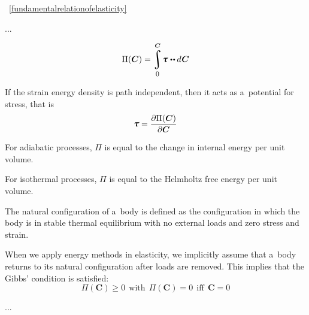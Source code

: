 

~\eqref{fundamentalrelationofelasticity}

...

{\small

\[ \Pi({\boldsymbol{\bm{C}}}) = \displaystyle \integral_{\raisemath{-0.25em}{\hspace{-0.1ex}\scalebox{0.85}{$0$}}}^{\raisemath{.15em}{\bm{C}}} \hspace{-0.25ex} \cauchystress \hspace{.1ex} \dotdotp d \hspace{.1ex} \boldsymbol{\bm{C}} \]

If the strain energy density is path independent, then it acts as a~potential for stress, that is
\[ \displaystyle \cauchystress = {\frac{\partial \Pi(\bm{C})}{\partial \bm{C}}} \]

For adiabatic processes, ${\Pi}$ is equal to the change in internal energy per unit volume.

For isothermal processes, ${\Pi}$ is equal to the Helmholtz free energy per unit volume.

The natural configuration of a~body is defined as the configuration in which the body is in stable thermal equilibrium with no external loads and zero stress and strain.

When we apply energy methods in elasticity, we implicitly assume that a~body returns to its natural configuration after loads are removed. This implies that the Gibbs’ condition is satisfied:
\[ \Pi({\boldsymbol{\bm{C}}}) \geq 0~~{\text{with}}~~\Pi({\boldsymbol{\bm{C}}}) = 0~~{\text{iff}}~~{\boldsymbol{\bm{C}}} = 0 \]

\par}

...

